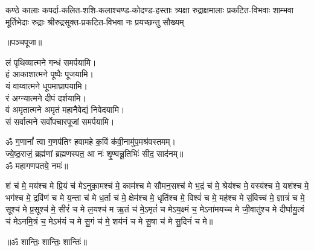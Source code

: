 {कण्ठे कालाः कपर्दा-कलित-शशि-कलाश्चण्ड-कोदण्ड-हस्ताः}
{त्र्यक्षा रुद्राक्षमालाः प्रकटित-विभवाः शाम्भवा मूर्तिभेदाः}
{रुद्राः श्रीरुद्रसूक्त-प्रकटित-विभवा नः प्रयच्छन्तु सौख्यम्}

\centerline{॥पञ्चपूजा॥}

लं पृथिव्यात्मने गन्धं समर्पयामि।\\
हं आकाशात्मने पूष्पैः पूजयामि।\\
यं वाय्वात्मने धूपमाघ्रापयामि।\\
रं अग्न्यात्मने दीपं दर्शयामि।\\
वं अमृतात्मने अमृतं महानैवेद्यं निवेदयामि।\\
सं सर्वात्मने सर्वोपचारपूजां समर्पयामि।

ॐ ग॒णानां᳚ त्वा ग॒णप॑तिꣳ हवामहे क॒विं क॑वी॒नामु॑प॒\-मश्र॑वस्तमम्। \\
ज्ये॒ष्ठ॒राजं॒ ब्रह्म॑णां ब्रह्मणस्पत॒ आ नः॑ शृ॒ण्वन्नू॒तिभिः॑ सीद॒ साद॑नम्॥ \\
ॐ महागणपतये॒ नमः॑॥ 


शं च॑ मे॒ मय॑श्च मे प्रि॒यं च॑ मेऽनुका॒मश्च॑ मे॒ काम॑श्च मे सौमन॒सश्च॑ मे भ॒द्रं च॑ मे॒ श्रेय॑श्च मे॒ वस्य॑श्च मे॒ यश॑श्च मे॒ भग॑श्च मे॒ द्रवि॑णं च मे य॒न्ता च॑ मे ध॒र्ता च॑ मे॒ क्षेम॑श्च मे॒ धृति॑श्च मे॒ विश्वं॑ च मे॒ मह॑श्च मे सं॒विच्च॑ मे॒ ज्ञात्रं॑ च मे॒ सूश्च॑ मे प्र॒सूश्च॑ मे॒ सीरं॑ च मे ल॒यश्च॑ म ऋ॒तं च॑ मे॒ऽमृतं॑ च मेऽय॒क्ष्मं च॒ मेऽना॑मयच्च मे जी॒वातु॑श्च मे दीर्घायु॒त्वं च॑ मेऽनमि॒त्रं च॒ मेऽभ॑यं च मे सु॒गं च॑ मे॒ शय॑नं च मे सू॒षा च॑ मे सु॒दिनं॑ च मे॥
\centerline{॥ॐ शान्तिः॒ शान्तिः॒ शान्तिः॑॥}



%
\newcommand{\cham}[3]{\begin{center}
धूपम्। दीपम्। नैवेद्यम्।\\
नीराजनम्—\\
#1\\
अनेन \textbf{#2}-वार-जपेन भगवान् सर्वात्मकः\\
\underline{\textbf{#3}} सुप्रीतः सुप्रसन्नो वरदो भवतु॥\devanumber{\arabic{cj}}॥
\end{center}}

\newcommand{\rudram}[1]{\sect{रुद्रप्रश्नः}
\begin{center}

ॐ नमो भगवते॑ रुद्रा॒य॥\\
 नम॑स्ते रुद्र म॒न्यव॑ उ॒तो त॒ इष॑वे॒ नमः॑। 
% 
$\ldots$\\
#1\\
$\ldots$\\

त्र्य॑म्बकं यजामहे सुग॒न्धिं पु॑ष्टि॒वर्ध॑नम्।\\ उ॒र्वा॒रु॒कमि॑व॒ बन्ध॑नान्मृ॒त्योर्मु॑क्षीय॒ माऽमृता᳚त्॥ 
\end{center}
}

